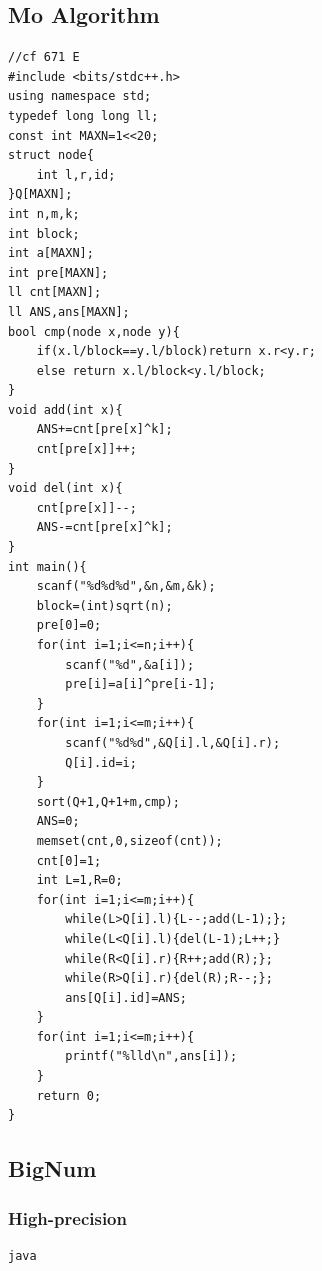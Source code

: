 \documentclass[twoside]{article}
\begin{document}
\subsection{Mo Algorithm}
\begin{lstlisting}
//cf 671 E
#include <bits/stdc++.h>
using namespace std;
typedef long long ll;
const int MAXN=1<<20;
struct node{
    int l,r,id;
}Q[MAXN];
int n,m,k;
int block;
int a[MAXN];
int pre[MAXN];
ll cnt[MAXN];
ll ANS,ans[MAXN];
bool cmp(node x,node y){
    if(x.l/block==y.l/block)return x.r<y.r;
    else return x.l/block<y.l/block;
}
void add(int x){
    ANS+=cnt[pre[x]^k];
    cnt[pre[x]]++;
}
void del(int x){
    cnt[pre[x]]--;
    ANS-=cnt[pre[x]^k];
}
int main(){
    scanf("%d%d%d",&n,&m,&k);
    block=(int)sqrt(n);
    pre[0]=0;
    for(int i=1;i<=n;i++){
        scanf("%d",&a[i]);
        pre[i]=a[i]^pre[i-1];
    }
    for(int i=1;i<=m;i++){
        scanf("%d%d",&Q[i].l,&Q[i].r);
        Q[i].id=i;
    }
    sort(Q+1,Q+1+m,cmp);
    ANS=0;
    memset(cnt,0,sizeof(cnt));
    cnt[0]=1;
    int L=1,R=0;
    for(int i=1;i<=m;i++){
        while(L>Q[i].l){L--;add(L-1);};
        while(L<Q[i].l){del(L-1);L++;}
        while(R<Q[i].r){R++;add(R);};
        while(R>Q[i].r){del(R);R--;};
        ans[Q[i].id]=ANS;
    }
    for(int i=1;i<=m;i++){
        printf("%lld\n",ans[i]);
    }
    return 0;
}
\end{lstlisting}
\subsection{BigNum}
\subsubsection{High-precision}
\begin{lstlisting}
java
\end{lstlisting}
\end{document}
